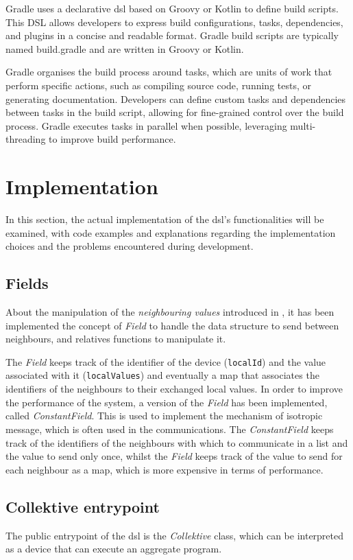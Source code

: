 Gradle uses a declarative \ac{dsl} based on Groovy or Kotlin to define build scripts.
This DSL allows developers to express build configurations, tasks, dependencies, and plugins in a concise and readable format.
Gradle build scripts are typically named build.gradle and are written in Groovy or Kotlin.

Gradle organises the build process around tasks, which are units of work that perform specific actions, such as compiling
source code, running tests, or generating documentation.
Developers can define custom tasks and dependencies between tasks in the build script, allowing for fine-grained control over the build process.
Gradle executes tasks in parallel when possible, leveraging multi-threading to improve build performance.

\section{Implementation}
\label{sec:implementation}
In this section, the actual implementation of the \ac{dsl}'s functionalities will be examined, with code examples and explanations
regarding the implementation choices and the problems encountered during development.

\subsection{Fields}
\label{subsec:fields}
About the manipulation of the \emph{neighbouring values} introduced in , it has been implemented
the concept of \emph{Field} to handle the data structure to send between neighbours, and relatives functions to manipulate it.

The \emph{Field} keeps track of the identifier of the device (\texttt{localId}) and the value associated with it
(\texttt{localValues}) and eventually a map that associates the identifiers of the neighbours to their exchanged local values.
In order to improve the performance of the system, a version of the \emph{Field} has been implemented, called \emph{ConstantField}.
This is used to implement the mechanism of isotropic message, which is often used in the communications.
The \emph{ConstantField} keeps track of the identifiers of the neighbours with which to communicate in a list and the value to send only once,
whilst the \emph{Field} keeps track of the value to send for each neighbour as a map, which is more expensive in terms of performance.

\subsection{Collektive entrypoint}
\label{subsec:collektive-entrypoint}
The public entrypoint of the \ac{dsl} is the \emph{Collektive} class, which can be interpreted as a device that can
execute an aggregate program.

